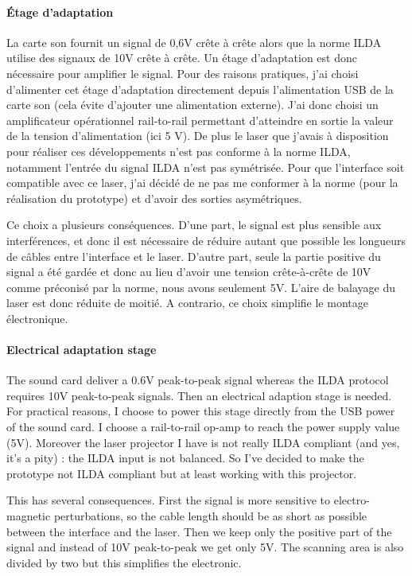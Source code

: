 \begin{fr}
\paragraph*{Étage d'adaptation}
La carte son fournit un signal de 0,6\unit{V} crête à crête alors que la norme ILDA utilise des signaux de 10\unit{V} crête à crête.
Un étage d'adaptation est donc nécessaire pour amplifier le signal.
Pour des raisons pratiques, j'ai choisi d'alimenter cet étage d'adaptation directement depuis l'alimentation USB de la carte son (cela évite d'ajouter une alimentation externe). 
J'ai donc choisi un amplificateur opérationnel rail-to-rail permettant d'atteindre en sortie la valeur de la tension d'alimentation (ici 5 V). 
De plus le laser que j'avais à disposition pour réaliser ces développements n'est pas conforme à la norme ILDA, notamment l'entrée du signal ILDA n'est pas symétrisée. 
Pour que l'interface soit compatible avec ce laser, j'ai décidé de ne pas me conformer à la norme (pour la réalisation du prototype) et d'avoir des sorties asymétriques.

Ce choix a plusieurs conséquences. 
D'une part, le signal est plus sensible aux interférences, et donc il est nécessaire de réduire autant que possible les longueurs de câbles entre l'interface et le laser. 
D'autre part, seule la partie positive du signal a été gardée et donc au lieu d'avoir une tension crête-à-crête de 10\unit{V} comme préconisé par la norme, nous avons seulement 5\unit{V}. 
L'aire de balayage du laser est donc réduite de moitié.
A contrario, ce choix simplifie le montage électronique.
\end{fr}

\begin{en}
\paragraph*{Electrical adaptation stage}
The sound card deliver a 0.6\unit{V} peak-to-peak signal whereas the ILDA protocol requires 10\unit{V} peak-to-peak signals.
Then an electrical adaption stage is needed.
For practical reasons, I choose to power this stage directly from the USB power of the sound card.
I choose a rail-to-rail op-amp to reach the power supply value (5\unit{V}).
Moreover the laser projector I have is not really ILDA compliant (and yes, it's a pity) : the ILDA input is not balanced.
So I've decided to make the prototype not ILDA compliant but at least working with this projector.

This has several consequences.
First the signal is more sensitive to electro-magnetic perturbations, so the cable length should be as short as possible between the interface and the laser.
Then we keep only the positive part of the signal and instead of 10\unit{V} peak-to-peak we get only 5\unit{V}.
The scanning area is also divided by two but this simplifies the electronic.
\end{en}


